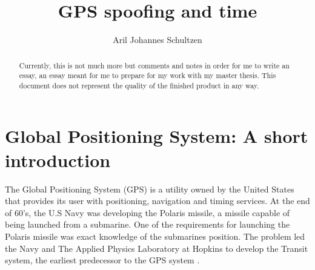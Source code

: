 \documentclass[12pt,english,a4paper]{article}
\title{GPS spoofing and time}
\author{Aril Johannes Schultzen}
\begin{document}
\maketitle
\thispagestyle{empty}
\setcounter{page}{0}
\tableofcontents
\thispagestyle{empty}
\setcounter{page}{0}
\thispagestyle{empty}
\setcounter{page}{0}

\begin{abstract}
Currently, this is not much more but comments and notes in order for me to write an essay, an essay meant for me to prepare for my work with my master thesis. This document does not represent the quality of the finished product in any way.
\end{abstract}

\clearpage
\setcounter{page}{1}

\section{Global Positioning System: A short introduction}
The Global Positioning System (GPS) is a utility owned by the United States that provides its user with positioning, navigation and timing services. At the end of 60's, the U.S Navy was developing the Polaris missile, a missile capable of being launched from a submarine. One of the requirements for launching the Polaris missile was exact knowledge of the submarines position. The problem led the Navy and The Applied Physics Laboratory at Hopkins to develop the Transit system, the earliest predecessor to the GPS system \cite{SteJ}.
\end{document}
